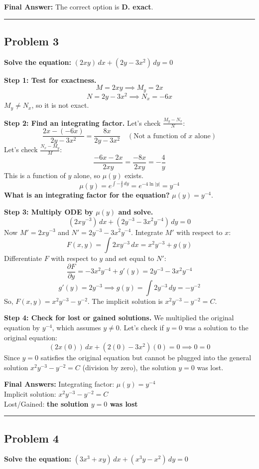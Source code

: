 \documentclass[11pt]{article}
\begin{document}
\textbf{Final Answer:} 
The correct option is \textbf{D. exact}.

\noindent\rule{\textwidth}{0.4pt}

\subsection*{Problem 3}
\textbf{Solve the equation: } $(2xy) \, dx + (2y - 3x^2) \, dy = 0$

\textbf{Step 1: Test for exactness.}
\[ M = 2xy \implies M_y = 2x \]
\[ N = 2y - 3x^2 \implies N_x = -6x \]
$M_y \neq N_x$, so it is not exact.

\textbf{Step 2: Find an integrating factor.}
Let's check $\frac{M_y - N_x}{N}$:
\[ \frac{2x - (-6x)}{2y - 3x^2} = \frac{8x}{2y - 3x^2} \quad (\text{Not a function of } x \text{ alone}) \]
Let's check $\frac{N_x - M_y}{M}$:
\[ \frac{-6x - 2x}{2xy} = \frac{-8x}{2xy} = -\frac{4}{y} \]
This is a function of $y$ alone, so $\mu(y)$ exists.
\[ \mu(y) = e^{\int -\frac{4}{y} \, dy} = e^{-4\ln|y|} = y^{-4} \]
\textbf{What is an integrating factor for the equation?} $\mu(y) = y^{-4}$.

\textbf{Step 3: Multiply ODE by $\mu(y)$ and solve.}
\[ (2xy^{-3}) \, dx + (2y^{-3} - 3x^2y^{-4}) \, dy = 0 \]
Now $M' = 2xy^{-3}$ and $N' = 2y^{-3} - 3x^2y^{-4}$.
Integrate $M'$ with respect to $x$:
\[ F(x,y) = \int 2xy^{-3} \, dx = x^2y^{-3} + g(y) \]
Differentiate $F$ with respect to $y$ and set equal to $N'$:
\[ \frac{\partial F}{\partial y} = -3x^2y^{-4} + g'(y) = 2y^{-3} - 3x^2y^{-4} \]
\[ g'(y) = 2y^{-3} \implies g(y) = \int 2y^{-3} \, dy = -y^{-2} \]
So, $F(x,y) = x^2y^{-3} - y^{-2}$. 
The implicit solution is $x^2y^{-3} - y^{-2} = C$.

\textbf{Step 4: Check for lost or gained solutions.}
We multiplied the original equation by $y^{-4}$, which assumes $y \neq 0$. Let's check if $y=0$ was a solution to the original equation:
\[ (2x(0)) \, dx + (2(0) - 3x^2)(0) = 0 \implies 0 = 0 \]
Since $y=0$ satisfies the original equation but cannot be plugged into the general solution $x^2y^{-3} - y^{-2} = C$ (division by zero), the solution $y=0$ was lost.

\textbf{Final Answers:}
Integrating factor: $\mu(y) = y^{-4}$ \\
Implicit solution: $x^2y^{-3} - y^{-2} = C$ \\
Lost/Gained: \textbf{the solution $y=0$ was lost}

\noindent\rule{\textwidth}{0.4pt}

\subsection*{Problem 4}
\textbf{Solve the equation: } $(3x^3 + xy) \, dx + (x^3y - x^2) \, dy = 0$
\end{document}
